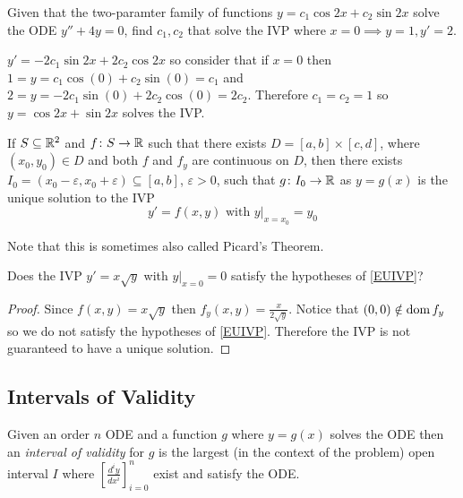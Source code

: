 \documentclass[notes]{subfiles}
\begin{document}
\begin{exercise}
    Given that the two-paramter family of functions $y = c_1\cos 2x + c_2\sin 2x$ solve the ODE $y'' + 4y = 0$, find $c_1, c_2$ that solve the IVP where $x = 0 \implies y = 1, y' = 2$.
\end{exercise}
\begin{solution}
    $y' = -2c_1 \sin 2x + 2c_2 \cos 2x$ so consider that if $x = 0$ then
    $1 = y = c_1 \cos (0) + c_2 \sin (0) = c_1$ and $2 = y = -2c_1 \sin (0) + 2c_2 \cos (0) = 2c_2$. Therefore $c_1 = c_2 = 1$ so $y = \cos 2x + \sin 2x$ solves the IVP.
\end{solution}

\begin{theorem} \label{EUIVP}
    If $S \subseteq \mathbb{R}^2$ and $f\colon S \to \mathbb{R}$ such that there exists $D = [a, b] \times [c, d]$, where $(x_0, y_0) \in D$ and both $f$ and $f_y$ are continuous on $D$, then there exists $I_0 = (x_0 - \varepsilon, x_0 + \varepsilon) \subseteq [a, b]$, $\varepsilon >0$, such that $g\colon I_0 \to \mathbb{R}$ as $y = g(x)$ is the unique solution to the IVP
    \[
        y' = f(x, y) \text{ with } y|_{x = x_0} = y_0
    \]
\end{theorem}

Note that this is sometimes also called Picard's Theorem.

\begin{exercise}
    Does the IVP $y' = x\sqrt{y}$ with $y|_{x = 0} = 0$ satisfy the hypotheses of \cref{EUIVP}?
\end{exercise}
\begin{proof}
    Since $f(x, y) = x\sqrt{y}$ then $f_y(x, y) = \frac{x}{2\sqrt{y}}$. Notice that $(0, 0) \notin \operatorname{dom} f_y$ so we do not satisfy the hypotheses of \cref{EUIVP}. Therefore the IVP is not guaranteed to have a unique solution.
\end{proof}

\subsection{Intervals of Validity}
\begin{definition}
    Given an order $n$ ODE and a function $g$ where $y = g(x)$ solves the ODE then an \textsl{interval of validity} for $g$ is the largest (in the context of the problem) open interval $I$ where $\left[ \frac{d^i y}{dx^i} \right]_{i = 0}^n$ exist and satisfy the ODE. 
\end{definition}
\end{document}
